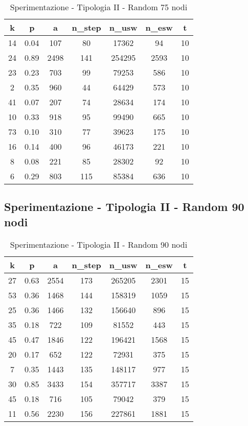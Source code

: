 \begin{table}[H]
\centering
\begin{tabular}{|c|c|c|c|c|c|c|}
\hline
\textbf{k} & \textbf{p} & \textbf{a} & \textbf{n\_step} & \textbf{n\_usw} & \textbf{n\_esw} & \textbf{t} \\ \hline
14 & 0.04 & 107 & 80 & 17362 & 94 & 10 \\ \hline
24 & 0.89 & 2498 & 141 & 254295 & 2593 & 10 \\ \hline
23 & 0.23 & 703 & 99 & 79253 & 586 & 10 \\ \hline
2 & 0.35 & 960 & 44 & 64429 & 573 & 10 \\ \hline
41 & 0.07 & 207 & 74 & 28634 & 174 & 10 \\ \hline
10 & 0.33 & 918 & 95 & 99490 & 665 & 10 \\ \hline
73 & 0.10 & 310 & 77 & 39623 & 175 & 10 \\ \hline
16 & 0.14 & 400 & 96 & 46173 & 221 & 10 \\ \hline
8 & 0.08 & 221 & 85 & 28302 & 92 & 10 \\ \hline
6 & 0.29 & 803 & 115 & 85384 & 636 & 10 \\ \hline
\end{tabular}
\caption{Sperimentazione - Tipologia II - Random 75 nodi}
\label{tab:sperimentazione-tipo1-75nodi}
\end{table}

\subsection{Sperimentazione - Tipologia II - Random 90 nodi}

\begin{table}[H]
\centering
\begin{tabular}{|c|c|c|c|c|c|c|}
\hline
\textbf{k} & \textbf{p} & \textbf{a} & \textbf{n\_step} & \textbf{n\_usw} & \textbf{n\_esw} & \textbf{t} \\ \hline
27 & 0.63 & 2554 & 173 & 265205 & 2301 & 15 \\ \hline
53 & 0.36 & 1468 & 144 & 158319 & 1059 & 15 \\ \hline
25 & 0.36 & 1466 & 132 & 156640 & 896 & 15 \\ \hline
35 & 0.18 & 722 & 109 & 81552 & 443 & 15 \\ \hline
45 & 0.47 & 1846 & 122 & 196421 & 1568 & 15 \\ \hline
20 & 0.17 & 652 & 122 & 72931 & 375 & 15 \\ \hline
7 & 0.35 & 1443 & 135 & 148117 & 977 & 15 \\ \hline
30 & 0.85 & 3433 & 154 & 357717 & 3387 & 15 \\ \hline
45 & 0.18 & 716 & 105 & 79042 & 379 & 15 \\ \hline
11 & 0.56 & 2230 & 156 & 227861 & 1881 & 15 \\ \hline
\end{tabular}
\caption{Sperimentazione - Tipologia II - Random 90 nodi}
\label{tab:sperimentazione-tipo1-90nodi}
\end{table}

